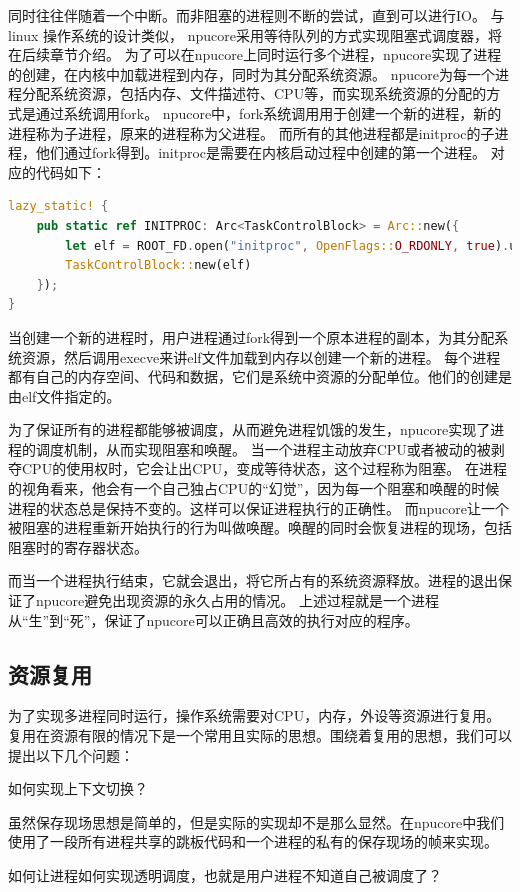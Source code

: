 同时往往伴随着一个中断。而非阻塞的进程则不断的尝试，直到可以进行IO。
与 linux 操作系统的设计类似， npucore采用等待队列的方式实现阻塞式调度器，将在后续章节介绍。
为了可以在npucore上同时运行多个进程，npucore实现了进程的创建，在内核中加载进程到内存，同时为其分配系统资源。
npucore为每一个进程分配系统资源，包括内存、文件描述符、CPU等，而实现系统资源的分配的方式是通过系统调用fork。
npucore中，fork系统调用用于创建一个新的进程，新的进程称为子进程，原来的进程称为父进程。
而所有的其他进程都是initproc的子进程，他们通过fork得到。initproc是需要在内核启动过程中创建的第一个进程。
对应的代码如下：
\begin{lstlisting}[language=rust]
    lazy_static! {
    pub static ref INITPROC: Arc<TaskControlBlock> = Arc::new({
        let elf = ROOT_FD.open("initproc", OpenFlags::O_RDONLY, true).unwrap();
        TaskControlBlock::new(elf)
    });
}
\end{lstlisting}
当创建一个新的进程时，用户进程通过fork得到一个原本进程的副本，为其分配系统资源，然后调用execve来讲elf文件加载到内存以创建一个新的进程。
每个进程都有自己的内存空间、代码和数据，它们是系统中资源的分配单位。他们的创建是由elf文件指定的。

为了保证所有的进程都能够被调度，从而避免进程饥饿的发生，npucore实现了进程的调度机制，从而实现阻塞和唤醒。
当一个进程主动放弃CPU或者被动的被剥夺CPU的使用权时，它会让出CPU，变成等待状态，这个过程称为阻塞。
在进程的视角看来，他会有一个自己独占CPU的“幻觉”，因为每一个阻塞和唤醒的时候进程的状态总是保持不变的。这样可以保证进程执行的正确性。
而npucore让一个被阻塞的进程重新开始执行的行为叫做唤醒。唤醒的同时会恢复进程的现场，包括阻塞时的寄存器状态。

而当一个进程执行结束，它就会退出，将它所占有的系统资源释放。进程的退出保证了npucore避免出现资源的永久占用的情况。
上述过程就是一个进程从“生”到“死”，保证了npucore可以正确且高效的执行对应的程序。

\subsection{资源复用}
为了实现多进程同时运行，操作系统需要对CPU，内存，外设等资源进行复用。
复用在资源有限的情况下是一个常用且实际的思想。围绕着复用的思想，我们可以提出以下几个问题：

如何实现上下文切换？

虽然保存现场思想是简单的，但是实际的实现却不是那么显然。在npucore中我们使用了一段所有进程共享的跳板代码和一个进程的私有的保存现场的帧来实现。

如何让进程如何实现透明调度，也就是用户进程不知道自己被调度了？

